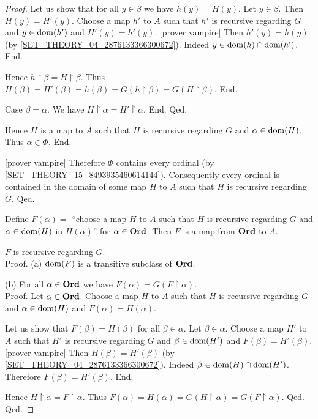 \documentclass[../../set-theory/set-theory.tex]{subfiles}
\begin{document}
\begin{forthel}
\begin{proof}
              Let us show that for all $y \in \beta$ we have $h(y) = H(y)$.
                Let $y \in \beta$.
                Then $H(y) = H'(y)$.
                Choose a map $h'$ to $A$ such that $h'$ is recursive regarding
                $G$ and $y \in \operatorname{dom}(h')$ and $H'(y) = h'(y)$.
                [prover vampire]
                Then $h'(y) = h(y)$ (by \cref{SET_THEORY_04_2876133366300672}).
                Indeed $y \in \operatorname{dom}(h) \cap \operatorname{dom}(h')$.
              End.

              Hence $h \restriction \beta = H \restriction \beta$.
              Thus $H(\beta)
                = H'(\beta)
                = h(\beta)
                = G(h \restriction \beta)
                = G(H \restriction \beta)$.
            End.

            Case $\beta = \alpha$.
              We have $H \restriction \alpha = H' \restriction \alpha$.
            End.
          Qed.

          Hence $H$ is a map to $A$ such that $H$ is recursive regarding $G$ and
          $\alpha \in \operatorname{dom}(H)$.
          Thus $\alpha \in \Phi$.
        End.

        [prover vampire]
        Therefore $\Phi$ contains every ordinal (by
        \cref{SET_THEORY_15_8493935460614144}).
        Consequently every ordinal is contained in the domain of some map $H$ to
        $A$ such that $H$ is recursive regarding $G$.
      Qed.

      Define $F(\alpha) =$ ``choose a map $H$ to $A$ such that $H$ is recursive
      regarding $G$ and $\alpha \in \operatorname{dom}(H)$ in $H(\alpha)$'' for
      $\alpha \in \mathbf{Ord}$.
      Then $F$ is a map from $\mathbf{Ord}$ to $A$.

      $F$ is recursive regarding $G$. \\
      Proof.
        (a) $\operatorname{dom}(F)$ is a transitive subclass of $\mathbf{Ord}$.

        (b) For all $\alpha \in \mathbf{Ord}$ we have $F(\alpha) =
        G(F \restriction \alpha)$. \\
        Proof.
          Let $\alpha \in \mathbf{Ord}$.
          Choose a map $H$ to $A$ such that $H$ is recursive regarding $G$ and
          $\alpha \in \operatorname{dom}(H)$ and $F(\alpha) = H(\alpha)$.

          Let us show that $F(\beta) = H(\beta)$ for all $\beta \in \alpha$.
            Let $\beta \in \alpha$.
            Choose a map $H'$ to $A$ such that $H'$ is recursive regarding $G$
            and $\beta \in \operatorname{dom}(H')$ and $F(\beta) = H'(\beta)$.
            [prover vampire]
            Then $H(\beta) = H'(\beta)$ (by
            \cref{SET_THEORY_04_2876133366300672}).
            Indeed $\beta \in \operatorname{dom}(H) \cap \operatorname{dom}(H')$.
            Therefore $F(\beta) = H'(\beta)$.
          End.

          Hence $H \restriction \alpha = F \restriction \alpha$.
          Thus $F(\alpha)
            = H(\alpha)
            = G(H \restriction \alpha)
            = G(F \restriction \alpha)$.
        Qed.
      Qed.
    \end{proof}
  \end{forthel}
\end{document}
